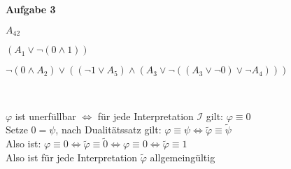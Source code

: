\documentclass[a4paper,10pt]{article}
\begin{document}
	\newpage
	\textbf{Aufgabe 3}
	\begin{compactenum} [(a)]
		\item 
		\begin{compactenum} [(i)]
			\item $ A_{42} $
			\item $ (A_1 \vee \lnot (0 \wedge 1)) $
			\item $ \lnot (0 \wedge A_2) \vee ((\lnot 1 \vee A_5) \wedge (A_3 \vee \lnot ((A_3 \vee \lnot 0) \vee \lnot A_4))) $
		\end{compactenum}\ 
		\item $ \varphi $ ist unerfüllbar $ \Leftrightarrow $ für jede Interpretation $ \mathcal{I} $ gilt: $ \varphi \equiv 0 $ \\
		Setze $ 0 = \psi $, nach Dualitätssatz gilt: $ \varphi \equiv \psi \Leftrightarrow \tilde{\varphi} \equiv \tilde{\psi} $ \\
		Also ist: $ \varphi \equiv 0 \Leftrightarrow \tilde{\varphi} \equiv \tilde{0} \Longleftrightarrow \varphi \equiv 0 \Leftrightarrow \tilde{\varphi} \equiv 1$ \\
		Also ist für jede Interpretation $ \tilde{\varphi} $ allgemeingültig \\
		

\end{compactenum}
\end{document}
